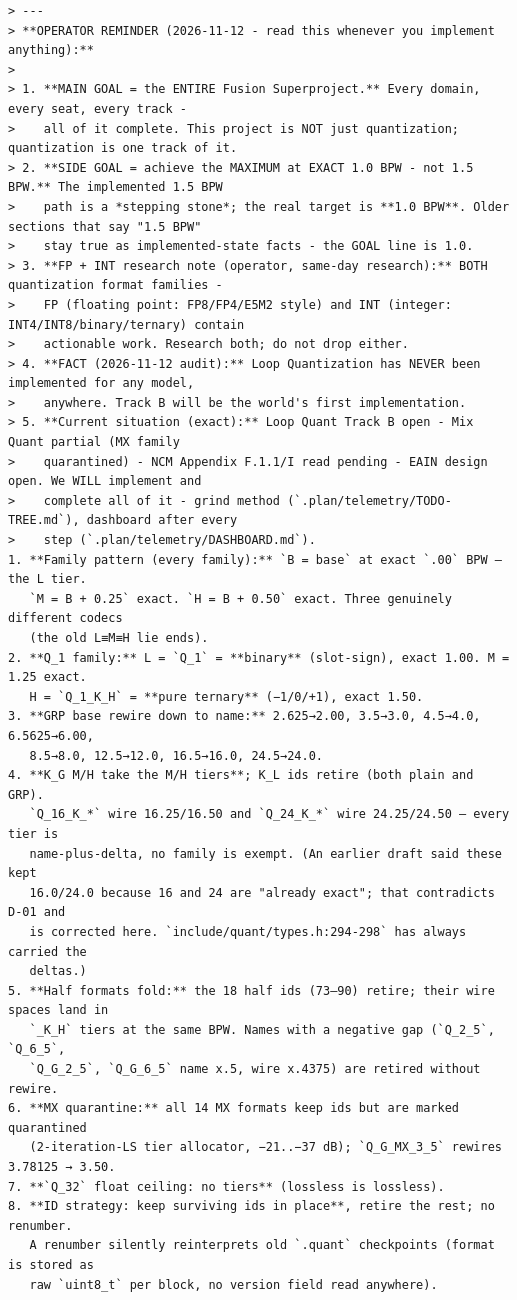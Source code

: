 \begin{verbatim}
> ---
> **OPERATOR REMINDER (2026-11-12 - read this whenever you implement anything):**
>
> 1. **MAIN GOAL = the ENTIRE Fusion Superproject.** Every domain, every seat, every track -
>    all of it complete. This project is NOT just quantization; quantization is one track of it.
> 2. **SIDE GOAL = achieve the MAXIMUM at EXACT 1.0 BPW - not 1.5 BPW.** The implemented 1.5 BPW
>    path is a *stepping stone*; the real target is **1.0 BPW**. Older sections that say "1.5 BPW"
>    stay true as implemented-state facts - the GOAL line is 1.0.
> 3. **FP + INT research note (operator, same-day research):** BOTH quantization format families -
>    FP (floating point: FP8/FP4/E5M2 style) and INT (integer: INT4/INT8/binary/ternary) contain
>    actionable work. Research both; do not drop either.
> 4. **FACT (2026-11-12 audit):** Loop Quantization has NEVER been implemented for any model,
>    anywhere. Track B will be the world's first implementation.
> 5. **Current situation (exact):** Loop Quant Track B open - Mix Quant partial (MX family
>    quarantined) - NCM Appendix F.1.1/I read pending - EAIN design open. We WILL implement and
>    complete all of it - grind method (`.plan/telemetry/TODO-TREE.md`), dashboard after every
>    step (`.plan/telemetry/DASHBOARD.md`).
1. **Family pattern (every family):** `B = base` at exact `.00` BPW — the L tier.
   `M = B + 0.25` exact. `H = B + 0.50` exact. Three genuinely different codecs
   (the old L≡M≡H lie ends).
2. **Q_1 family:** L = `Q_1` = **binary** (slot-sign), exact 1.00. M = 1.25 exact.
   H = `Q_1_K_H` = **pure ternary** (−1/0/+1), exact 1.50.
3. **GRP base rewire down to name:** 2.625→2.00, 3.5→3.0, 4.5→4.0, 6.5625→6.00,
   8.5→8.0, 12.5→12.0, 16.5→16.0, 24.5→24.0.
4. **K_G M/H take the M/H tiers**; K_L ids retire (both plain and GRP).
   `Q_16_K_*` wire 16.25/16.50 and `Q_24_K_*` wire 24.25/24.50 — every tier is
   name-plus-delta, no family is exempt. (An earlier draft said these kept
   16.0/24.0 because 16 and 24 are "already exact"; that contradicts D-01 and
   is corrected here. `include/quant/types.h:294-298` has always carried the
   deltas.)
5. **Half formats fold:** the 18 half ids (73–90) retire; their wire spaces land in
   `_K_H` tiers at the same BPW. Names with a negative gap (`Q_2_5`, `Q_6_5`,
   `Q_G_2_5`, `Q_G_6_5` name x.5, wire x.4375) are retired without rewire.
6. **MX quarantine:** all 14 MX formats keep ids but are marked quarantined
   (2-iteration-LS tier allocator, −21..−37 dB); `Q_G_MX_3_5` rewires 3.78125 → 3.50.
7. **`Q_32` float ceiling: no tiers** (lossless is lossless).
8. **ID strategy: keep surviving ids in place**, retire the rest; no renumber.
   A renumber silently reinterprets old `.quant` checkpoints (format is stored as
   raw `uint8_t` per block, no version field read anywhere).


\end{verbatim}
